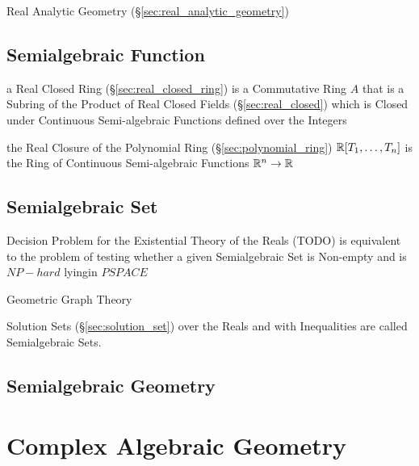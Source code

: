 Real Analytic Geometry (\S\ref{sec:real_analytic_geometry})



\subsection{Semialgebraic Function}\label{sec:semialgebraic_function}

a Real Closed Ring (\S\ref{sec:real_closed_ring}) is a Commutative Ring $A$
that is a Subring of the Product of Real Closed Fields
(\S\ref{sec:real_closed}) which is Closed under Continuous Semi-algebraic
Functions defined over the Integers

the Real Closure of the Polynomial Ring (\S\ref{sec:polynomial_ring})
$\mathbb{R}[T_1,\ldots,T_n]$ is the Ring of Continuous Semi-algebraic Functions
$\mathbb{R}^n \rightarrow \mathbb{R}$



\subsection{Semialgebraic Set}\label{sec:semialgebraic_set}

Decision Problem for the Existential Theory of the Reals (TODO) is equivalent
to the problem of testing whether a given Semialgebraic Set is Non-empty and is
$NP-hard$ lyingin $PSPACE$

Geometric Graph Theory

Solution Sets (\S\ref{sec:solution_set}) over the Reals and with Inequalities
are called Semialgebraic Sets.



\subsection{Semialgebraic Geometry}\label{sec:semialgebraic_geometry}



\section{Complex Algebraic Geometry}
\label{sec:complex_algebraic_geometry}

